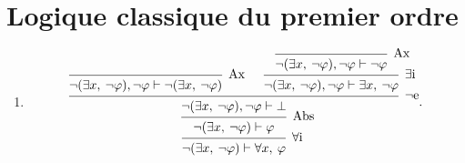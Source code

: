\section{Logique classique du premier ordre}

\begin{enumerate}
	\item
		\[
			\begin{prooftree}
				\infer 0[Ax]{\lnot (\exists x,\: \lnot \varphi), \lnot \varphi \vdash \lnot (\exists x,\: \lnot \varphi)}
				\infer 0[Ax]{\lnot (\exists x,\: \lnot \varphi), \lnot \varphi \vdash\lnot \varphi}
				\infer 1[$\exists$i]{\lnot (\exists x,\: \lnot \varphi), \lnot \varphi \vdash\exists x,\: \lnot \varphi}
				\infer 2[$\lnot$e]{\lnot (\exists x,\: \lnot \varphi),\lnot \varphi \vdash \bot}
				\infer 1[Abs]{\lnot (\exists x,\: \lnot \varphi) \vdash \varphi}
				\infer 1[$\forall$i]{\lnot (\exists x,\: \lnot \varphi) \vdash \forall x,\: \varphi}
			\end{prooftree}
		.\] 
\end{enumerate}
